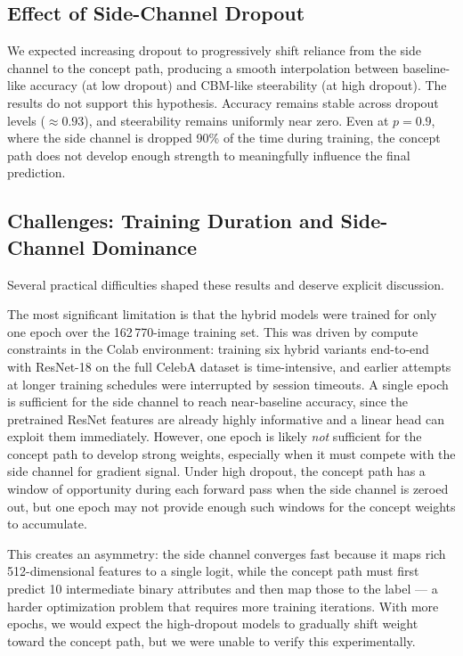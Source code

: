 \documentclass[11pt,a4paper]{article}
\begin{document}
\subsection{Effect of Side-Channel Dropout}

We expected increasing dropout to progressively shift reliance from the side channel to the concept path, producing a smooth interpolation between baseline-like accuracy (at low dropout) and CBM-like steerability (at high dropout). The results do not support this hypothesis. Accuracy remains stable across dropout levels ($\approx 0.93$), and steerability remains uniformly near zero. Even at $p = 0.9$, where the side channel is dropped 90\% of the time during training, the concept path does not develop enough strength to meaningfully influence the final prediction.

\subsection{Challenges: Training Duration and Side-Channel Dominance}
\label{sec:training_limitation}

Several practical difficulties shaped these results and deserve explicit discussion.

The most significant limitation is that the hybrid models were trained for only one epoch over the 162\,770-image training set. This was driven by compute constraints in the Colab environment: training six hybrid variants end-to-end with ResNet-18 on the full CelebA dataset is time-intensive, and earlier attempts at longer training schedules were interrupted by session timeouts. A single epoch is sufficient for the side channel to reach near-baseline accuracy, since the pretrained ResNet features are already highly informative and a linear head can exploit them immediately. However, one epoch is likely \emph{not} sufficient for the concept path to develop strong weights, especially when it must compete with the side channel for gradient signal. Under high dropout, the concept path has a window of opportunity during each forward pass when the side channel is zeroed out, but one epoch may not provide enough such windows for the concept weights to accumulate.

This creates an asymmetry: the side channel converges fast because it maps rich 512-dimensional features to a single logit, while the concept path must first predict 10 intermediate binary attributes and then map those to the label --- a harder optimization problem that requires more training iterations. With more epochs, we would expect the high-dropout models to gradually shift weight toward the concept path, but we were unable to verify this experimentally.
\end{document}
